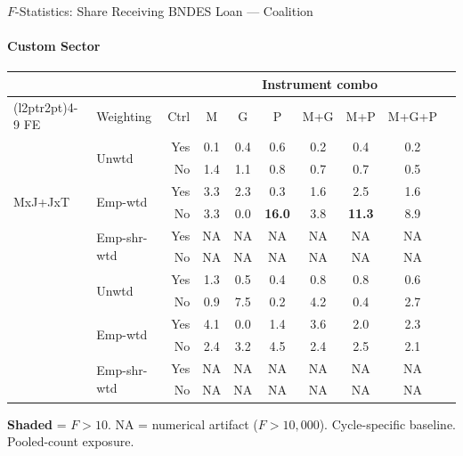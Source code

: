 \documentclass[aspectratio=169,10pt]{beamer}
\newcommand{\fpass}[1]{\cellcolor{pass}\textbf{#1}}
\begin{document}
\begin{frame}[t]{$F$-Statistics: Share Receiving BNDES Loan --- Coalition}
\framesubtitle{Custom Sector}
\begin{center}
\footnotesize
\setlength{\tabcolsep}{3.5pt}
\renewcommand{\arraystretch}{1.05}
\begin{tabular}{@{}llrccccccc@{}}
\toprule
 & & & \multicolumn{6}{c}{Instrument combo} \\
\cmidrule(l{2pt}r{2pt}){4-9}
FE & Weighting & Ctrl & M & G & P & M+G & M+P & M+G+P \\
\midrule
  \multirow{6}{*}{MxJ+JxT} & \multirow{2}{*}{Unwtd} & Yes & 0.1 & 0.4 & 0.6 & 0.2 & 0.4 & 0.2 \\
   &  & No & 1.4 & 1.1 & 0.8 & 0.7 & 0.7 & 0.5 \\
   & \multirow{2}{*}{Emp-wtd} & Yes & 3.3 & 2.3 & 0.3 & 1.6 & 2.5 & 1.6 \\
   &  & No & 3.3 & 0.0 & \fpass{16.0} & 3.8 & \fpass{11.3} & 8.9 \\
   & \multirow{2}{*}{Emp-shr-wtd} & Yes & NA & NA & NA & NA & NA & NA \\
   &  & No & NA & NA & NA & NA & NA & NA \\
\addlinespace[5pt]
  \multirow{6}{*}{MxJ+MxT} & \multirow{2}{*}{Unwtd} & Yes & 1.3 & 0.5 & 0.4 & 0.8 & 0.8 & 0.6 \\
   &  & No & 0.9 & 7.5 & 0.2 & 4.2 & 0.4 & 2.7 \\
   & \multirow{2}{*}{Emp-wtd} & Yes & 4.1 & 0.0 & 1.4 & 3.6 & 2.0 & 2.3 \\
   &  & No & 2.4 & 3.2 & 4.5 & 2.4 & 2.5 & 2.1 \\
   & \multirow{2}{*}{Emp-shr-wtd} & Yes & NA & NA & NA & NA & NA & NA \\
   &  & No & NA & NA & NA & NA & NA & NA \\
\bottomrule
\end{tabular}
\end{center}
{\scriptsize \colorbox{pass}{\textbf{Shaded}} = $F>10$. NA = numerical artifact ($F>10{,}000$). Cycle-specific baseline. Pooled-count exposure.}
\end{frame}
\end{document}
